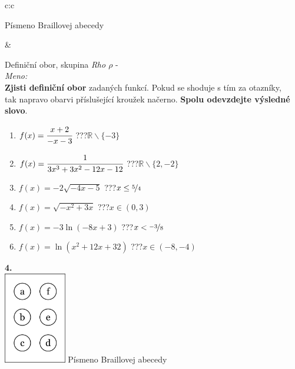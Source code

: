 \documentclass[10pt]{report}
\begin{document}
\begin{tabular}{c:c}
\begin{minipage}[c][99mm][t]{0.49\linewidth}
\begin{center}
\begin{minipage}{0.20\linewidth}
\begin{center}
{\small Písmeno Braillovej abecedy}
\end{center}
\end{minipage}
\end{center}
\end{minipage}
&
\begin{minipage}[c][99mm][t]{0.49\linewidth}
\begin{center}
\vspace{7mm}
{\huge Definiční obor, skupina \textit{Rho $\rho$} -}\\[4.5mm]
\textit{Meno:}\phantom{xxxxxxxxxxxxxxxxxxxxxxxxxxxxxxxxxxxxxxxxxxxxxxxxxxxxxxxxxxxxxxxxx}\\[3.5mm]
\textbf{Zjisti definiční obor} zadaných funkcí. Pokud se shoduje s tím za otazníky,\\tak napravo obarvi příslušející kroužek načerno. \textbf{Spolu odevzdejte výsledné slovo}.\\[3mm]
\begin{minipage}{0.77\linewidth}
\begin{center}
\begin{varwidth}{\textwidth}
\begin{enumerate}
\normalsize
\item $f(x)=\cfrac{x+2}{-x-3}$\quad \dotfill\; ???\;\dotfill \quad $\mathbb{R}\smallsetminus\{-3\}$
\item $f(x)=\cfrac{1}{3x^3+3x^2-12x-12}$\quad \dotfill\; ???\;\dotfill \quad $\mathbb{R}\smallsetminus\{2,-2\}$
\item $f(x)=-2\sqrt{-4x-5}$\quad \dotfill\; ???\;\dotfill \quad $x\leq\nicefrac{5}{4}$
\item $f(x)=\sqrt{-x^2+3x}$\quad \dotfill\; ???\;\dotfill \quad $x\in(0 , 3)$
\item $f(x)=-3\ln{(-8x+3)}$\quad \dotfill\; ???\;\dotfill \quad $x<\nicefrac{-3}{8}$
\item $f(x)=\ln{(x^2+12x+32)}$\quad \dotfill\; ???\;\dotfill \quad $x\in(-8 , -4)$
\end{enumerate}
\end{varwidth}
\end{center}
\end{minipage}
\begin{minipage}{0.20\linewidth}
\begin{center}
{\Huge\bfseries 4.} \\[2mm]
\includegraphics[height=40mm]{../images/braille.png}
{\small Písmeno Braillovej abecedy}
\end{center}
\end{minipage}
\end{center}
\end{minipage}
%
\end{tabular}
\end{document}
